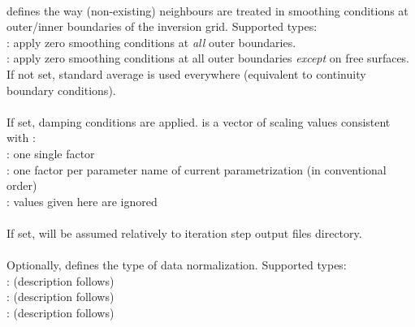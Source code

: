 \paragraph{}
 defines the way (non-existing) neighbours are treated in smoothing conditions at outer/inner 
boundaries of the inversion grid. Supported types:\\
: apply zero smoothing conditions at \emph{all} outer boundaries.\\
: apply zero smoothing conditions at all outer boundaries \emph{except} on free surfaces. \\
If not set, standard average is used everywhere (equivalent to continuity boundary conditions).
\paragraph{}
If set, damping conditions are applied.  is a vector of scaling values consistent 
with :\\
: one single factor\\
: one factor per parameter name of current parametrization (in conventional order)\\
 : values given here are ignored
\paragraph{}
If set,  will be assumed relatively to iteration step output files directory.
\paragraph{}
Optionally,  defines the type of data normalization. Supported types:\\
: (description follows)\\ %
: (description follows)\\ %
: (description follows) %
%
%

